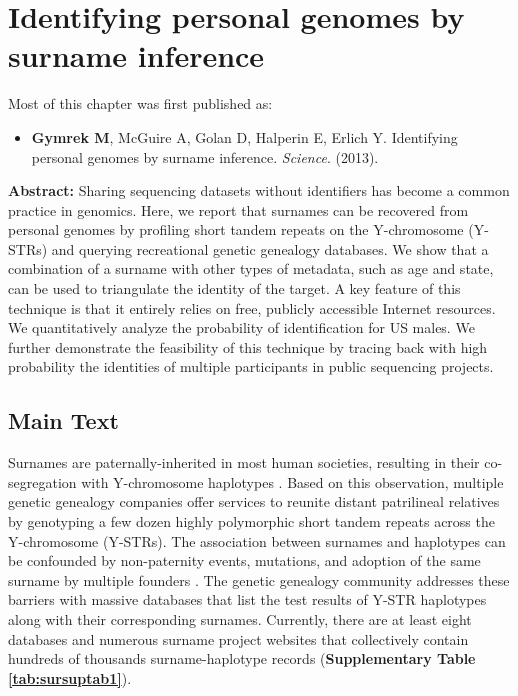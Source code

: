 \chapter{Identifying personal genomes by surname inference}

\hzline

Most of this chapter was first published as:

\begin{itemize}

\item[] \textbf{Gymrek M}, McGuire A, Golan D, Halperin E, Erlich Y. Identifying personal genomes by surname inference. \emph{Science}. (2013).
\end{itemize}

\hzline


\textbf{Abstract:} Sharing sequencing datasets without identifiers has become a common practice in genomics. Here, we report that surnames can be recovered from personal genomes by profiling short tandem repeats on the Y-chromosome (Y-STRs) and querying recreational genetic genealogy databases. We show that a combination of a surname with other types of metadata, such as age and state, can be used to triangulate the identity of the target. A key feature of this technique is that it entirely relies on free, publicly accessible Internet resources. We quantitatively analyze the probability of identification for US males. We further demonstrate the feasibility of this technique by tracing back with high probability the identities of multiple participants in public sequencing projects.

\section{Main Text}
Surnames are paternally-inherited in most human societies, resulting in their co-segregation with Y-chromosome haplotypes \cite{SykesIrven2000,KingBallereauSchurerEtAl2006,McEvoyBradley2006,KingJobling2009,KingJobling2009a}. Based on this observation, multiple genetic genealogy companies offer services to reunite distant patrilineal relatives by genotyping a few dozen highly polymorphic short tandem repeats across the Y-chromosome (Y-STRs). The association between surnames and haplotypes can be confounded by non-paternity events, mutations, and adoption of the same surname by multiple founders \cite{KingJobling2009}. The genetic genealogy community addresses these barriers with massive databases that list the test results of Y-STR haplotypes along with their corresponding surnames. Currently, there are at least eight databases and numerous surname project websites that collectively contain hundreds of thousands surname-haplotype records (\textbf{Supplementary Table \ref{tab:sursuptab1}}). 

